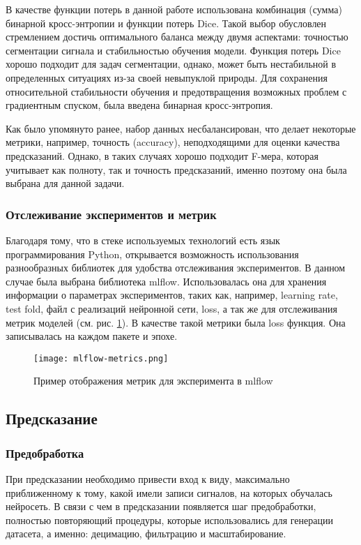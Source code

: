 В качестве функции потерь в данной работе использована комбинация (сумма) бинарной
кросс-энтропии и функции потерь Dice. Такой выбор обусловлен стремлением
достичь оптимального баланса между двумя аспектами: точностью сегментации
сигнала и стабильностью обучения модели. Функция потерь Dice хорошо подходит
для задач сегментации, однако, может быть нестабильной в определенных ситуациях
из-за своей невыпуклой природы. Для сохранения относительной стабильности
обучения и предотвращения возможных проблем с градиентным спуском, была введена
бинарная кросс-энтропия.

Как было упомянуто ранее, набор данных несбалансирован, что делает некоторые
метрики, например, точность (accuracy), неподходящими для оценки качества
предсказаний. Однако, в таких случаях хорошо подходит F-мера, которая
учитывает как полноту, так и точность предсказаний, именно поэтому она была
выбрана для данной задачи.

\subsubsection{Отслеживание экспериментов и метрик}

Благодаря тому, что в стеке используемых технологий есть язык программирования
Python, открывается возможность использования разнообразных библиотек для
удобства отслеживания экспериментов. В данном случае была выбрана библиотека
mlflow. Использовалась она для хранения информации о параметрах экспериментов,
таких как, например, learning rate, test fold, файл с реализаций нейронной
сети, loss, а так же для отслеживания метрик моделей (см. рис.
\ref{fig:mlflow-metrics}). В качестве такой метрики была loss функция. Она
записывалась на каждом пакете и эпохе.

\begin{figure}[!htb]
	\centering
	\texttt{[image: mlflow-metrics.png]}
	\caption{Пример отображения метрик для эксперимента в mlflow}
	\label{fig:mlflow-metrics}
\end{figure}

\subsection{Предсказание}
\subsubsection{Предобработка}

При предсказании необходимо привести вход к виду, максимально приближенному к
тому, какой имели записи сигналов, на которых обучалась нейросеть. В связи с
чем в предсказании появляется шаг предобработки, полностью повторяющий
процедуры, которые использовались для генерации датасета, а именно: децимацию,
фильтрацию и масштабирование.

